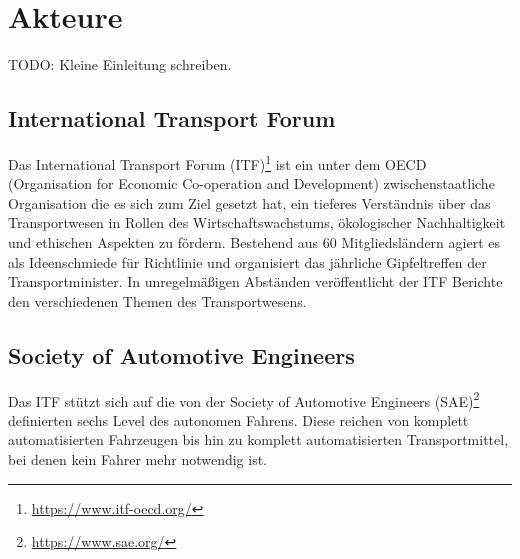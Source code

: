 \section{Akteure}
\label{sec:akteure}

TODO: Kleine Einleitung schreiben.

\subsection{International Transport Forum}

Das International Transport Forum (ITF)\footnote{\url{https://www.itf-oecd.org/}} ist ein unter dem OECD (Organisation for Economic Co-operation and Development) zwischenstaatliche Organisation die es sich zum Ziel gesetzt hat, ein tieferes Verständnis über das Transportwesen in Rollen des Wirtschaftswachstums, ökologischer Nachhaltigkeit und ethischen Aspekten zu fördern. Bestehend aus 60 Mitgliedsländern agiert es als Ideenschmiede für Richtlinie und organisiert das jährliche Gipfeltreffen der Transportminister. In unregelmäßigen Abständen veröffentlicht der ITF Berichte den verschiedenen Themen des Transportwesens.\\

\subsection{Society of Automotive Engineers}

\cite{standardSAE}\cite{smith2015automated} Das ITF stützt sich auf die von der Society of Automotive Engineers (SAE)\footnote{\url{https://www.sae.org/}}  definierten sechs Level des autonomen Fahrens. Diese reichen von komplett automatisierten Fahrzeugen bis hin zu komplett automatisierten Transportmittel, bei denen kein Fahrer mehr notwendig ist.\\